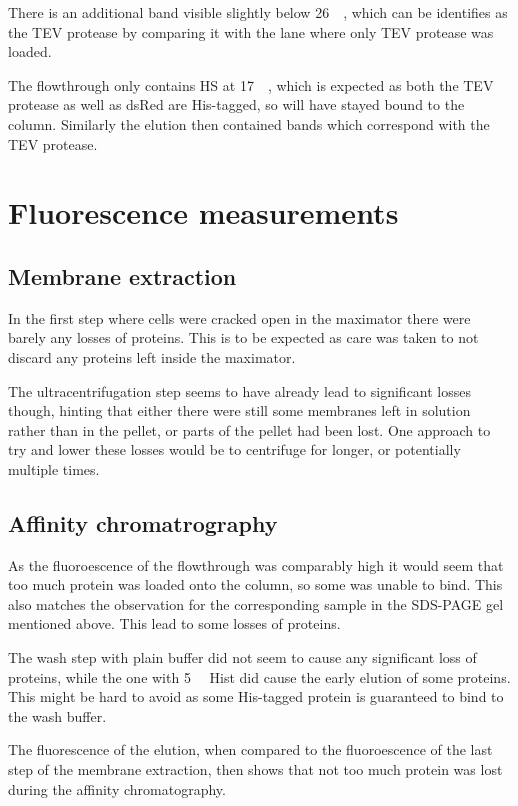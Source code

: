 There is an additional band visible slightly below \SI{26}{\kilo\Da}, which can
be identifies as the TEV protease by comparing it with the lane where only TEV
protease was loaded.

The flowthrough only contains HS at \SI{17}{\kilo\Da}, which is expected as
both the TEV protease as well as dsRed are His-tagged, so will have stayed
bound to the column. Similarly the elution then contained bands which
correspond with the TEV protease.

\section{Fluorescence measurements}

\subsection{Membrane extraction}

In the first step where cells were cracked open in the maximator there were
barely any losses of proteins. This is to be expected as care was taken to not
discard any proteins left inside the maximator.

The ultracentrifugation step seems to have already lead to significant losses
though, hinting that either there were still some membranes left in solution
rather than in the pellet, or parts of the pellet had been lost. One approach
to try and lower these losses would be to centrifuge for longer, or potentially
multiple times.

\subsection{Affinity chromatrography}

As the fluoroescence of the flowthrough was comparably high it would seem that
too much protein was loaded onto the column, so some was unable to bind. This
also matches the observation for the corresponding sample in the SDS-PAGE gel
mentioned above. This lead to some losses of proteins.

The wash step with plain buffer did not seem to cause any significant loss of
proteins, while the one with \SI{5}{\milli\Molar} Hist did cause the early
elution of some proteins. This might be hard to avoid as some His-tagged
protein is guaranteed to bind to the wash buffer.

The fluorescence of the elution, when compared to the fluoroescence of the last
step of the membrane extraction, then shows that not too much protein was lost
during the affinity chromatography.

